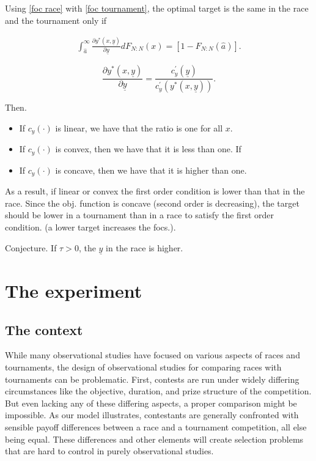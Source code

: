\documentclass[10pt, titlepage]{article}
\newcommand\target{\underline{y}}
\newcommand\mtype{\hat{a}}
\newcommand\dystar{\frac{\partial y^*(x,\target)}{\partial\target}dF_{N:N}(x)}
\begin{document}
Using \eqref{foc race} with \eqref{foc tournament}, the optimal target
is the same in the race and the tournament only if

\begin{align} 
  \int_{\mtype}^\infty \dystar = [1- F_{N:N}(\mtype)].
\end{align}

\[
  \frac{\partial y^*(x, \target)}{\partial \target} = 
    \frac{c_y^\prime(\target)}{c_y^\prime(y^*(x, \target))}. 
\]

Then.

\begin{itemize}
\item
  If \(c_y(\cdot)\) is linear, we have that the ratio is one for all
  \(x\).
\item
  If \(c_y(\cdot)\) is convex, then we have that it is less than one. If
\item
  If \(c_y(\cdot)\) is concave, then we have that it is higher than one.
\end{itemize}

As a result, if linear or convex the first order condition is lower than
that in the race. Since the obj. function is concave (second order is
decreasing), the target should be lower in a tournament than in a race
to satisfy the first order condition. (a lower target increases the
focs.).

Conjecture. If \(\tau>0\), the \(\target\) in the race is higher.

\section{The experiment}\label{the-experiment}

\subsection{The context}\label{the-context}

While many observational studies have focused on various aspects of
races and tournaments, the design of observational studies for comparing
races with tournaments can be problematic. First, contests are run under
widely differing circumstances like the objective, duration, and prize
structure of the competition. But even lacking any of these differing
aspects, a proper comparison might be impossible. As our model
illustrates, contestants are generally confronted with sensible payoff
differences between a race and a tournament competition, all else being
equal. These differences and other elements will create selection
problems that are hard to control in purely observational studies.
\end{document}
